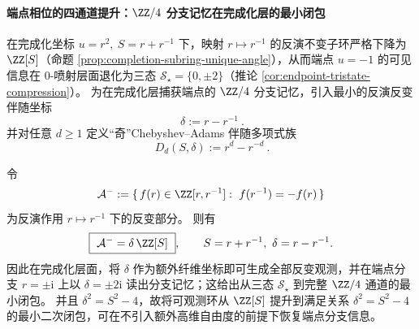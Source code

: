 \paragraph{端点相位的四通道提升：\texorpdfstring{$\ZZ/4$}{Z/4} 分支记忆在完成化层的最小闭包}
在完成化坐标 \(u=r^{2},\ S=r+r^{-1}\) 下，映射 \(r\mapsto r^{-1}\) 的反演不变子环严格下降为 \(\ZZ[S]\)（命题 \ref{prop:completion-subring-unique-angle}），从而端点 \(u=-1\) 的可见信息在 \(0\)-喷射层面退化为三态 \(\mathcal S_\star=\{0,\pm 2\}\)（推论 \ref{cor:endpoint-tristate-compression}）。
为在完成化层捕获端点的 \(\ZZ/4\) 分支记忆，引入最小的反演反变伴随坐标
\begin{equation}\label{eq:endpoint-delta-anti-invariant}
\boxed{\ \delta:=r-r^{-1}\ }.
\end{equation}
并对任意 \(d\ge 1\) 定义“奇”Chebyshev--Adams 伴随多项式族
\begin{equation}\label{eq:endpoint-odd-chebyshev-adams}
\boxed{\ D_d(S,\delta):=r^{d}-r^{-d}\ }.
\end{equation}

\begin{remark}[反演反变扇区的主生成元与最小闭包]\label{rem:endpoint-inv-antiinv-min-closure}
令
\[
\mathcal A^{-}:=\{\,f(r)\in \ZZ[r,r^{-1}]:\ f(r^{-1})=-f(r)\,\}
\]
为反演作用 \(r\mapsto r^{-1}\) 下的反变部分。
则有
\[
\boxed{\ \mathcal A^{-}=\delta\,\ZZ[S]\ },\qquad S=r+r^{-1},\ \delta=r-r^{-1}.
\]
因此在完成化层面，将 \(\delta\) 作为额外纤维坐标即可生成全部反变观测，并在端点分支 \(r=\pm\mathrm{i}\) 上以 \(\delta=\pm 2\mathrm{i}\) 读出分支记忆；这给出从三态 \(\mathcal S_\star\) 到完整 \(\ZZ/4\) 通道的最小闭包。
并且 \(\delta^2=S^2-4\)，故将可观测环从 \(\ZZ[S]\) 提升到满足关系 \(\delta^2=S^2-4\) 的最小二次闭包，可在不引入额外高维自由度的前提下恢复端点分支信息。
\end{remark}

